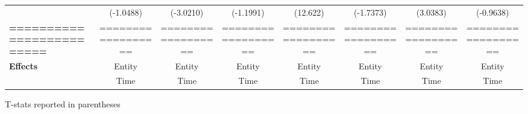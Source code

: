 \begin{center}
\begin{tabular}{lccccccc}
\textbf{ }                         &      (-1.0488)       &          (-3.0210)          &          (-1.1991)           &               (12.622)              &            (-1.7373)             &           (3.0383)          &           (-0.9638)            \\
\textbf{=========================} &  ==================  &      ==================     &      ==================      &          ==================         &        ==================        &      ==================     &       ==================       \\
\textbf{Effects}                   &        Entity        &            Entity           &            Entity            &                Entity               &              Entity              &            Entity           &             Entity             \\
\textbf{}                          &         Time         &             Time            &             Time             &                 Time                &               Time               &             Time            &              Time              \\
\bottomrule
\end{tabular}
\end{center}

T-stats reported in parentheses